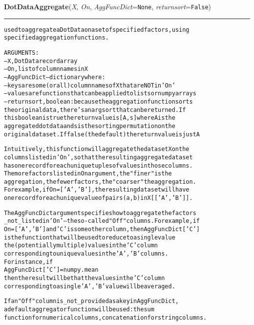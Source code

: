 \hspace{.8\funcindent}\begin{boxedminipage}{\funcwidth}

    \raggedright \textbf{DotDataAggregate}(\textit{X}, \textit{On}, \textit{AggFuncDict}={\tt None}, \textit{returnsort}={\tt False})

    \vspace{-1.5ex}

    \rule{\textwidth}{0.5\fboxrule}
\setlength{\parskip}{2ex}
\begin{alltt}

used to aggregate a DotData on a set of specified factors, using
specified aggregation functions. 

ARGUMENTS:
-- X, DotData record array
-- On, list of column names in X
-- AggFuncDict -- dictionary where:
        -- keys are some (or all) column names of X that are NOT in 'On'  
        -- values are functions that can be applied to lists or numpy arrays
-- returnsort, boolean:  because the aggregation function sorts 
the original data, there's an argsort that can be returned.  If 
this boolean is true the return value is        [A,s] where A is the 
aggregated dotdata and s is the sorting permutation on the
original data set.  If false (the default) the return value is just A

Intuitively, this function will aggregate the dataset X on the 
columns listed in 'On', so that the resulting aggregate data set 
has one record for each unique tuples of values in those columns.   
The more factors listed in On argument, the "finer" is the 
aggregation, the fewer factors, the "coarser" the aggregation.    
For example, if On = ['A','B'], the resulting data set will have 
one record for each unique value of pairs (a,b) in X[['A','B']].   

The AggFuncDict argument specifies how to aggregate the factors
\_not\_ listed in 'On' -- the so-called "Off" columns. For example, if
On = ['A','B'] and 'C' is some other column, then AggFuncDict['C'] 
is the function that will be used to reduce to a single value
the (potentially multiple) values in the 'C' column 
corresponding to unique values in the 'A', 'B' columns.   
For instance, if
        AggFuncDict['C'] = numpy.mean
then the result will be that the values in the 'C' column 
corresponding to a single 'A','B' value will be averaged.  

If an "Off" column is \_not\_ provided as a key in AggFuncDict, 
a default aggregator function will be used:  the sum 
function for numerical columns, concatenation for string columns.    
        
\end{alltt}

\setlength{\parskip}{1ex}
    \end{boxedminipage}

